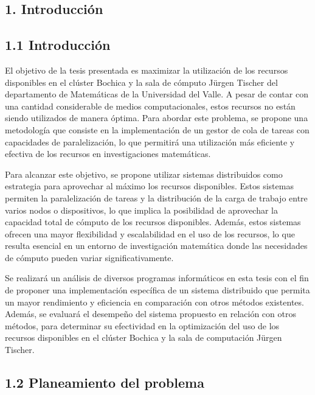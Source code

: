 \begin{spacing}{1.5}
\begin{tightcenter}
\section{1. Introducción}
\mylinespacing
\end{tightcenter}

\begin{multicols}{2}

    \subsection{1.1  Introducción}
    El objetivo de la tesis presentada es maximizar la utilización de los recursos disponibles en el clúster Bochica y la sala de cómputo Jürgen Tischer del departamento de Matemáticas de la Universidad del Valle. A pesar de contar con una cantidad considerable de medios computacionales, estos recursos no están siendo utilizados de manera óptima. Para abordar este problema, se propone una metodología que consiste en la implementación de un gestor de cola de tareas con capacidades de paralelización, lo que permitirá una utilización más eficiente y efectiva de los recursos en investigaciones matemáticas.

    Para alcanzar este objetivo, se propone utilizar sistemas distribuidos como estrategia para aprovechar al máximo los recursos disponibles. Estos sistemas permiten la paralelización de tareas y la distribución de la carga de trabajo entre varios nodos o dispositivos, lo que implica la posibilidad de aprovechar la capacidad total de cómputo de los recursos disponibles. Además, estos sistemas ofrecen una mayor flexibilidad y escalabilidad en el uso de los recursos, lo que resulta esencial en un entorno de investigación matemática donde las necesidades de cómputo pueden variar significativamente.

    Se realizará un análisis de diversos programas informáticos en esta tesis con el fin de proponer una implementación específica de un sistema distribuido que permita un mayor rendimiento y eficiencia en comparación con otros métodos existentes. Además, se evaluará el desempeño del sistema propuesto en relación con otros métodos, para determinar su efectividad en la optimización del uso de los recursos disponibles en el clúster Bochica y la sala de computación Jürgen Tischer.
    
    \subsection{1.2 Planeamiento del problema}


\end{multicols}
\end{spacing}

